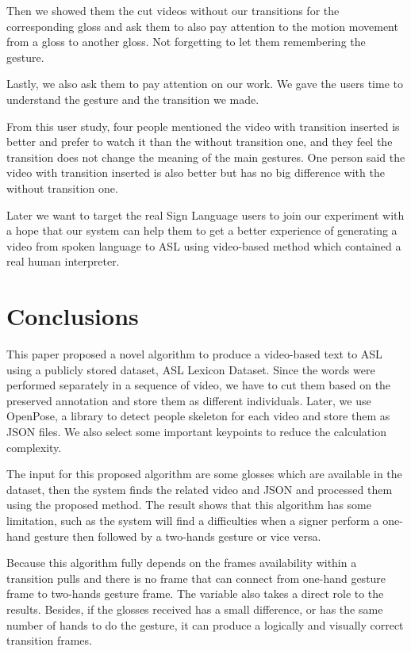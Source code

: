 \documentclass{sig-alternate-05-2015}
\begin{document}
Then we showed them the cut videos without our transitions for the corresponding gloss and ask them to also pay attention to the motion movement from a gloss to another gloss. Not forgetting to let them remembering the gesture.

Lastly, we also ask them to pay attention on our work. We gave the users time to understand the gesture and the transition we made.

From this user study, four people mentioned the video with transition inserted is better and prefer to watch it than the without transition one, and they feel the transition does not change the meaning of the main gestures. One person said the video with transition inserted is also better but has no big difference with the without transition one.

Later we want to target the real Sign Language users to join our experiment with a hope that our system can help them to get a better experience of generating a video from spoken language to ASL using video-based method which contained a real human interpreter.

\section{Conclusions}
This paper proposed a novel algorithm to produce a video-based text to ASL using a publicly stored dataset, ASL Lexicon Dataset. Since the words were performed separately in a sequence of video, we have to cut them based on the preserved annotation and store them as different individuals. Later, we use OpenPose, a library to detect people skeleton for each video and store them as JSON files. We also select some important keypoints to reduce the calculation complexity. 

The input for this proposed algorithm are some glosses which are available in the dataset, then the system finds the related video and JSON and processed them using the proposed method. The result shows that this algorithm has some limitation, such as the system will find a difficulties when a signer perform a one-hand gesture then followed by a two-hands gesture or vice versa. 

Because this algorithm fully depends on the frames availability within a transition pulls and there is no frame that can connect from one-hand gesture frame to two-hands gesture frame. The variable also takes a direct role to the results. Besides, if the glosses received has a small difference, or has the same number of hands to do the gesture, it can produce a logically and visually correct transition frames. 
\end{document}
